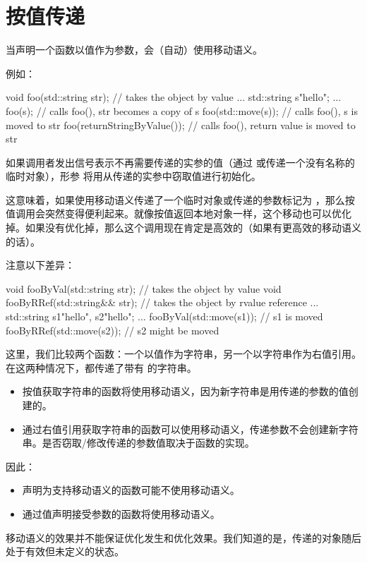 \section{按值传递}
当声明一个函数以值作为参数，会（自动）使用移动语义。

例如：

\begin{cppcode}
void foo(std::string str); // takes the object by value
...
std::string s{"hello"};
...
foo(s); // calls foo(), str becomes a copy of s
foo(std::move(s)); // calls foo(), s is moved to str
foo(returnStringByValue()); // calls foo(), return value is moved to str
\end{cppcode}

如果调用者发出信号表示不再需要传递的实参的值（通过  或传递一个没有名称的临时对象），形参  将用从传递的实参中窃取值进行初始化。

这意味着，如果使用移动语义传递了一个临时对象或传递的参数标记为 ，那么按值调用会突然变得便利起来。就像按值返回本地对象一样，这个移动也可以优化掉。如果没有优化掉，那么这个调用现在肯定是高效的（如果有更高效的移动语义的话）。

注意以下差异：

\begin{cppcode}
void fooByVal(std::string str); // takes the object by value
void fooByRRef(std::string&& str); // takes the object by rvalue reference
...
std::string s1{"hello"}, s2{"hello"};
...
fooByVal(std::move(s1)); // s1 is moved
fooByRRef(std::move(s2)); // s2 might be moved
\end{cppcode}

这里，我们比较两个函数：一个以值作为字符串，另一个以字符串作为右值引用。在这两种情况下，都传递了带有  的字符串。

\begin{itemize}
	\item 按值获取字符串的函数将使用移动语义，因为新字符串是用传递的参数的值创建的。
	\item 通过右值引用获取字符串的函数可以使用移动语义，传递参数不会创建新字符串。是否窃取/修改传递的参数值取决于函数的实现。
\end{itemize}

因此：

\begin{itemize}
	\item 声明为支持移动语义的函数可能不使用移动语义。
	\item 通过值声明接受参数的函数将使用移动语义。
\end{itemize}

移动语义的效果并不能保证优化发生和优化效果。我们知道的是，传递的对象随后处于有效但未定义的状态。













